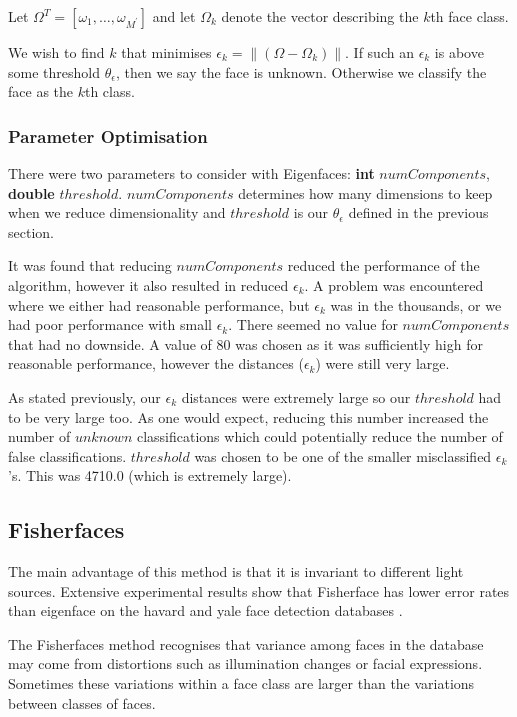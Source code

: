 \documentclass{article}
\begin{document}
Let $\Omega^T = [\omega_1, \ldots, \omega_{M^\prime}]$ and let $\Omega_k$ denote the vector describing the $k$th face class.

We wish to find $k$ that minimises $\epsilon_k = \|(\Omega - \Omega_k)\|$. If such an $\epsilon_k$ is above some threshold $\theta_\epsilon$, then we say the face is unknown. Otherwise we classify the face as the $k$th class.

\subsubsection{Parameter Optimisation}
There were two parameters to consider with Eigenfaces: \textbf{int} $numComponents$, \textbf{double} $threshold$. $numComponents$ determines how many dimensions to keep when we reduce dimensionality and $threshold$ is our $\theta_\epsilon$ defined in the previous section.

It was found that reducing $numComponents$ reduced the performance of the algorithm, however it also resulted in reduced $\epsilon_k$. A problem was encountered where we either had reasonable performance, but $\epsilon_k$ was in the thousands, or we had poor performance with small $\epsilon_k$. There seemed no value for $numComponents$ that had no downside. A value of 80 was chosen as it was sufficiently high for reasonable performance, however the distances ($\epsilon_k$) were still very large.

As stated previously, our $\epsilon_k$ distances were extremely large so our $threshold$ had to be very large too. As one would expect, reducing this number increased the number of $unknown$ classifications which could potentially reduce the number of false classifications. $threshold$ was chosen to be one of the smaller misclassified $\epsilon_k$'s. This was 4710.0 (which is extremely large).

\subsection{Fisherfaces}
The main advantage of this method is that it is invariant to different light sources. Extensive experimental results show that Fisherface has lower error rates than eigenface on the havard and yale face detection databases \cite{belhumeur1997eigenfaces}.

The Fisherfaces method recognises that variance among faces in the database may come from distortions such as illumination changes or facial expressions. Sometimes these variations within a face class are larger than the variations between classes of faces.
\end{document}
